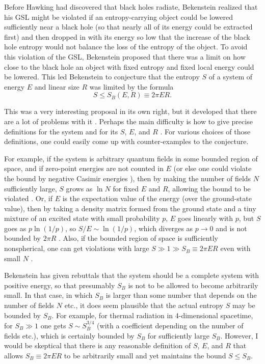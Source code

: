 \documentclass[12pt]{article} \usepackage{latexsym} \textwidth 15cm
\begin{document}
Before Hawking had discovered that black holes radiate, Bekenstein
\cite{Bek3,Bek4} realized that his GSL might be violated if an
entropy-carrying object could be lowered sufficiently near a black
hole (so that nearly all of its energy could be extracted first) and
then dropped in with its energy so low that the increase of the black
hole entropy would not balance the loss of the entropy of the object.
To avoid this violation of the GSL, Bekenstein proposed that there was
a limit on how close to the black hole an object with fixed entropy
and fixed local energy could be lowered.  This led Bekenstein to
conjecture \cite{Bek5} that the entropy $S$ of a system of energy $E$
and linear size $R$ was limited by the formula
 \begin{equation}
 S \le S_B(E,R) \equiv 2\pi ER.
 \label{eq:19}
 \end{equation}

This was a very interesting proposal in its own right, but it
developed that there are a lot of problems with it
\cite{Unwin,Page82,UW,Deutsch,UW2,Zas,PW,Page00a,Page00b,Page00c,MS}.
Perhaps the main difficulty is how to give precise definitions for the
system and for its $S$, $E$, and $R$ \cite{Page00c}.  For various
choices of those definitions, one could easily come up with
counter-examples to the conjecture.

For example, if the system is arbitrary quantum fields in some bounded
region of space, and if zero-point energies are not counted in $E$ (or
else one could violate the bound by negative Casimir energies
\cite{Unwin}), then by making the number of fields $N$ sufficiently
large, $S$ grows as $\ln{N}$ for fixed $E$ and $R$, allowing the bound
to be violated \cite{Page82,UW}.  Or, if $E$ is the expectation value
of the energy (over the ground-state value), then by taking a density
matrix formed from the ground state and a tiny mixture of an excited
state with small probability $p$, $E$ goes linearly with $p$, but $S$
goes as $p\ln{(1/p)}$, so $S/E \sim \ln{(1/p)}$, which diverges as $p
\rightarrow 0$ and is not bounded by $2\pi R$
\cite{Deutsch,Page00a,Page00b,Page00c}.  Also, if the bounded region
of space is sufficiently nonspherical, one can get violations with
large $S \gg 1 \gg S_B \equiv 2\pi ER$ even with small $N$
\cite{Page00a,Page00b}.

Bekenstein has given rebuttals \cite{Bek6,Bek7,Bek8,Bek9,Bek10} that
the system should be a complete system with positive energy, so that
presumably $S_B$ is not to be allowed to become arbitrarily small.  In
that case, in which $S_B$ is larger than some number that depends on
the number of fields $N$ etc., it does seem plausible that the actual
entropy $S$ may be bounded by $S_B$.  For example, for thermal
radiation in 4-dimensional spacetime, for $S_B \gg 1$ one gets $S \sim
S_B^{3/4}$ (with a coefficient depending on the number of fields
etc.), which is certainly bounded by $S_B$ for sufficiently large
$S_B$.  However, I would be skeptical that there is any reasonable
definition of $S$, $E$, and $R$ that allows $S_B \equiv 2\pi ER$ to be
arbitrarily small and yet maintains the bound $S \le S_B$.
\end{document}

